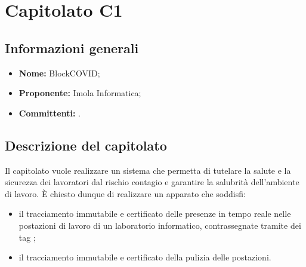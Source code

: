 \section{Capitolato C1}

\subsection{Informazioni generali}
\begin{itemize}
\item \textbf{Nome:} BlockCOVID;
\item \textbf{Proponente:} Imola Informatica;
\item \textbf{Committenti:} \committenti{}.
\end{itemize}

\subsection{Descrizione del capitolato}
Il capitolato vuole realizzare un sistema che permetta di tutelare la salute e la sicurezza dei lavoratori dal rischio contagio e garantire la salubrità dell'ambiente di lavoro. È chiesto dunque di realizzare un apparato che soddisfi:
\begin{itemize}
\item il tracciamento immutabile e certificato delle presenze in tempo reale nelle postazioni di lavoro di un laboratorio informatico, contrassegnate tramite dei tag ;
\item il tracciamento immutabile e certificato della pulizia delle postazioni.
\end{itemize}

